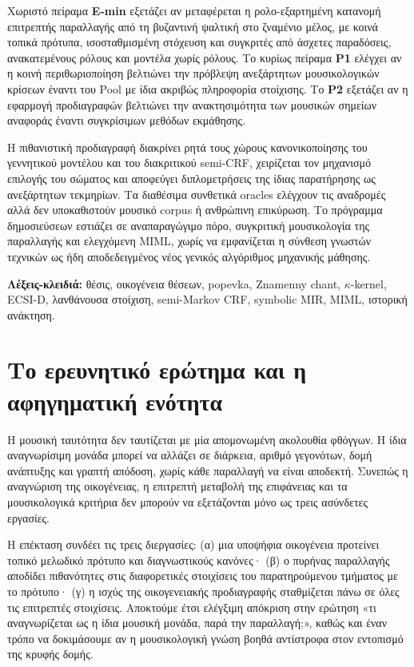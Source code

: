 \documentclass[
  10pt,
  a4paper,
]{report}
\begin{document}
Χωριστό πείραμα \textbf{E-min} εξετάζει αν μεταφέρεται η ρολο-εξαρτημένη
κατανομή επιτρεπτής παραλλαγής από τη βυζαντινή ψαλτική στο ζναμένιο
μέλος, με κοινά τοπικά πρότυπα, ισοσταθμισμένη στόχευση και συγκριτές
από άσχετες παραδόσεις, ανακατεμένους ρόλους και μοντέλα χωρίς ρόλους.
Το κυρίως πείραμα \textbf{P1} ελέγχει αν η κοινή περιθωριοποίηση
βελτιώνει την πρόβλεψη ανεξάρτητων μουσικολογικών κρίσεων έναντι του
Pool με ίδια ακριβώς πληροφορία στοίχισης. Το \textbf{P2} εξετάζει αν η
εφαρμογή προδιαγραφών βελτιώνει την ανακτησιμότητα των μουσικών σημείων
αναφοράς έναντι συγκρίσιμων μεθόδων εκμάθησης.

Η πιθανιστική προδιαγραφή διακρίνει ρητά τους χώρους κανονικοποίησης του
γεννητικού μοντέλου και του διακριτικού semi-CRF, χειρίζεται τον
μηχανισμό επιλογής του σώματος και αποφεύγει διπλομετρήσεις της ίδιας
παρατήρησης ως ανεξάρτητων τεκμηρίων. Τα διαθέσιμα συνθετικά oracles
ελέγχουν τις αναδρομές αλλά δεν υποκαθιστούν μουσικό corpus ή ανθρώπινη
επικύρωση. Το πρόγραμμα δημοσιεύσεων εστιάζει σε αναπαραγώγιμο πόρο,
συγκριτική μουσικολογία της παραλλαγής και ελεγχόμενη MIML, χωρίς να
εμφανίζεται η σύνθεση γνωστών τεχνικών ως ήδη αποδεδειγμένος νέος
γενικός αλγόριθμος μηχανικής μάθησης.

\textbf{Λέξεις-κλειδιά:} θέσις, οικογένεια θέσεων, popevka, Znamenny
chant, \(\kappa\)-kernel, ECSI-D, λανθάνουσα στοίχιση, semi-Markov CRF,
symbolic MIR, MIML, ιστορική ανάκτηση.

\chapter{Το ερευνητικό ερώτημα και η αφηγηματική
ενότητα}\label{ux3c4ux3bf-ux3b5ux3c1ux3b5ux3c5ux3bdux3b7ux3c4ux3b9ux3baux3cc-ux3b5ux3c1ux3ceux3c4ux3b7ux3bcux3b1-ux3baux3b1ux3b9-ux3b7-ux3b1ux3c6ux3b7ux3b3ux3b7ux3bcux3b1ux3c4ux3b9ux3baux3ae-ux3b5ux3bdux3ccux3c4ux3b7ux3c4ux3b1}

Η μουσική ταυτότητα δεν ταυτίζεται με μία απομονωμένη ακολουθία φθόγγων.
Η ίδια αναγνωρίσιμη μονάδα μπορεί να αλλάζει σε διάρκεια, αριθμό
γεγονότων, δομή ανάπτυξης και γραπτή απόδοση, χωρίς κάθε παραλλαγή να
είναι αποδεκτή. Συνεπώς η αναγνώριση της οικογένειας, η επιτρεπτή
μεταβολή της επιφάνειας και τα μουσικολογικά κριτήρια δεν μπορούν να
εξετάζονται μόνο ως τρεις ασύνδετες εργασίες.

Η επέκταση συνδέει τις τρεις διεργασίες: (α) μια υποψήφια οικογένεια
προτείνει τοπικό μελωδικό πρότυπο και διαγνωστικούς κανόνες· (β) ο
πυρήνας παραλλαγής αποδίδει πιθανότητες στις διαφορετικές στοιχίσεις του
παρατηρούμενου τμήματος με το πρότυπο· (γ) η ισχύς της οικογενειακής
προδιαγραφής σταθμίζεται πάνω σε όλες τις επιτρεπτές στοιχίσεις.
Αποκτούμε έτσι ελέγξιμη απόκριση στην ερώτηση «τι αναγνωρίζεται ως η
ίδια μουσική μονάδα, παρά την παραλλαγή;», καθώς και έναν τρόπο να
δοκιμάσουμε αν η μουσικολογική γνώση βοηθά αντίστροφα στον εντοπισμό της
κρυφής δομής.
\end{document}

